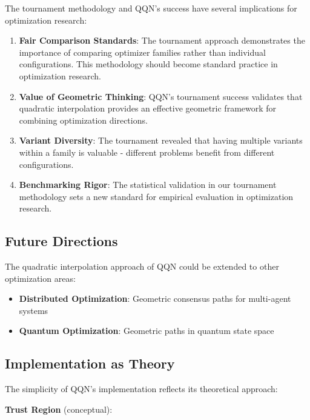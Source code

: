 The tournament methodology and QQN's success have several implications for optimization research:

\begin{enumerate}
\def\labelenumi{\arabic{enumi}.}
\item
  \textbf{Fair Comparison Standards}: The tournament approach demonstrates the importance of comparing optimizer families rather than individual configurations. This methodology should become standard practice in optimization research.
\item
  \textbf{Value of Geometric Thinking}: QQN's tournament success validates that quadratic interpolation provides an effective geometric framework for combining optimization directions.
\item
  \textbf{Variant Diversity}: The tournament revealed that having multiple variants within a family is valuable - different problems benefit from different configurations.
\item
  \textbf{Benchmarking Rigor}: The statistical validation in our tournament methodology sets a new standard for empirical evaluation in optimization research.
\end{enumerate}

\hypertarget{future-directions}{%
\subsection{Future Directions}\label{future-directions}}

The quadratic interpolation approach of QQN could be extended to other optimization areas:

\begin{itemize}
\tightlist
\item
  \textbf{Distributed Optimization}: Geometric consensus paths for multi-agent systems
\item
  \textbf{Quantum Optimization}: Geometric paths in quantum state space
\end{itemize}

\hypertarget{implementation-as-theory}{%
\subsection{Implementation as Theory}\label{implementation-as-theory}}

The simplicity of QQN's implementation reflects its theoretical approach:

\textbf{Trust Region} (conceptual):

